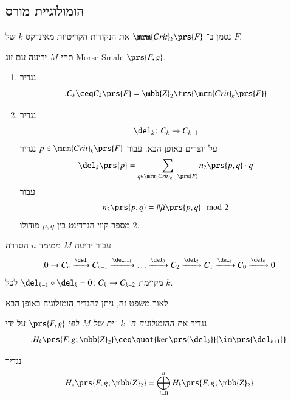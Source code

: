 \documentclass[a4paper,10pt,twoside,openany]{book}
\begin{document}
\subsection{הומולוגיית מורס}

\begin{notation}
נסמן ב־%
$\mrm{Crit}_k\prs{F}$
את הנקודות הקריטיות מאינדקס
$k$
של
$F$.
\end{notation}

\begin{definition}
תהי
$M$
יריעה עם זוג
\textenglish{Morse-Smale}
$\prs{F,g}$.

\begin{enumerate}
\item נגדיר
\[\text{.} C_k \ceq C_k\prs{F} = \mbb{Z}_2\trs{\mrm{Crit}_k\prs{F}}\]
\item נגדיר
\[\del_k \colon C_k \to C_{k-1}\]
על יוצרים באופן הבא.
עבור
$p \in \mrm{Crit}_k\prs{F}$
נגדיר
\begin{align*}
\del_k\prs{p} = \sum_{q \in \mrm{Crit}_{k-1}\prs{F}} n_2\prs{p,q} \cdot q
\end{align*}
עבור
\[n_2\prs{p,q} = \# \hat{\mu}\prs{p,q} \mod{2}\]
מספר קווי הגרדינט בין
$p,q$
מודולו
$2$.
\end{enumerate}
\end{definition}

\begin{theorem}
עבור יריעה
$M$
ממימד
$n$
הסדרה
\[\text{.} 0 \to C_n \xrightarrow{\del} C_{n-1} \xrightarrow{\del_{n-1}} \ldots \xrightarrow{\del_3} C_2 \xrightarrow{\del_2} C_1 \xrightarrow{\del_1} C_0 \xrightarrow{\del_0} 0\]
מקיימת
$\del_{k-1} \circ \del_k = 0 \colon C_k \to C_{k-2}$
לכל
$k$.
\end{theorem}

לאור משפט זה, ניתן להגדיר הומולוגיה באופן הבא.

\begin{definition}
נגדיר את
\emph{ההומולוגיה ה־%
$k$%
־ית של
$M$
לפי
$\prs{F,g}$}
על ידי
\[\text{.} H_k\prs{F,g;\mbb{Z}_2} \ceq \quot{\ker\prs{\del_k}}{\im\prs{\del_{k+1}}}\]
\end{definition}

\begin{definition}
נגדיר
\[\text{.} H_*\prs{F,g;\mbb{Z}_2} = \bigoplus_{i = 0}^n H_k\prs{F,g;\mbb{Z}_2}\]
\end{definition}
\end{document}
